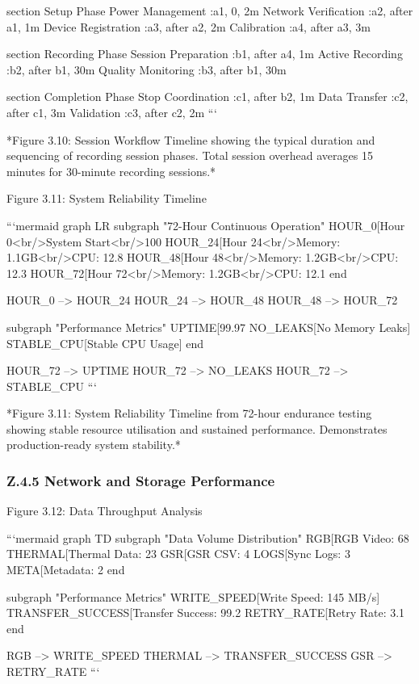 section Setup Phase
Power Management :a1, 0, 2m
Network Verification :a2, after a1, 1m
Device Registration :a3, after a2, 2m
Calibration :a4, after a3, 3m

section Recording Phase
Session Preparation :b1, after a4, 1m
Active Recording :b2, after b1, 30m
Quality Monitoring :b3, after b1, 30m

section Completion Phase
Stop Coordination :c1, after b2, 1m
Data Transfer :c2, after c1, 3m
Validation :c3, after c2, 2m
```

*Figure 3.10: Session Workflow Timeline showing the typical duration and
sequencing of recording session phases. Total session overhead averages
15 minutes for 30-minute recording sessions.*

Figure 3.11: System Reliability Timeline

```mermaid
graph LR
subgraph "72-Hour Continuous Operation"
HOUR_0[Hour 0<br/>System Start<br/>100%
HOUR_24[Hour 24<br/>Memory: 1.1GB<br/>CPU: 12.8%
HOUR_48[Hour 48<br/>Memory: 1.2GB<br/>CPU: 12.3%
HOUR_72[Hour 72<br/>Memory: 1.2GB<br/>CPU: 12.1%
end

HOUR_0 --> HOUR_24
HOUR_24 --> HOUR_48
HOUR_48 --> HOUR_72

subgraph "Performance Metrics"
UPTIME[99.97%
NO_LEAKS[No Memory Leaks]
STABLE_CPU[Stable CPU Usage]
end

HOUR_72 --> UPTIME
HOUR_72 --> NO_LEAKS
HOUR_72 --> STABLE_CPU
```

*Figure 3.11: System Reliability Timeline from 72-hour endurance testing
showing stable resource utilisation and sustained performance.
Demonstrates production-ready system stability.*

\subsubsection{Z.4.5 Network and Storage Performance}

Figure 3.12: Data Throughput Analysis

```mermaid
graph TD
subgraph "Data Volume Distribution"
RGB[RGB Video: 68%
THERMAL[Thermal Data: 23%
GSR[GSR CSV: 4%
LOGS[Sync Logs: 3%
META[Metadata: 2%
end

subgraph "Performance Metrics"
WRITE_SPEED[Write Speed: 145 MB/s]
TRANSFER_SUCCESS[Transfer Success: 99.2%
RETRY_RATE[Retry Rate: 3.1%
end

RGB --> WRITE_SPEED
THERMAL --> TRANSFER_SUCCESS
GSR --> RETRY_RATE
```

